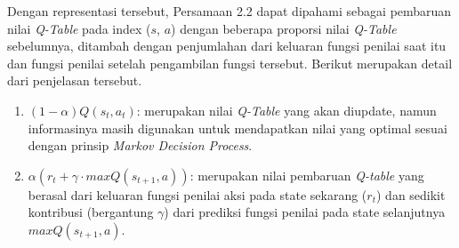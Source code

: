 Dengan representasi tersebut, Persamaan 2.2 dapat dipahami sebagai pembaruan nilai \textit{Q-Table} pada index (\(s\), \(a\)) dengan beberapa proporsi nilai \textit{Q-Table} sebelumnya, ditambah dengan penjumlahan dari keluaran fungsi penilai saat itu dan fungsi penilai setelah pengambilan fungsi tersebut. Berikut merupakan detail dari penjelasan tersebut.


\begin{enumerate}
	\item \((1-\alpha) Q(s_t,a_t)\): merupakan nilai \textit{Q-Table} yang akan diupdate, namun informasinya masih digunakan untuk mendapatkan nilai yang optimal sesuai dengan prinsip \textit{Markov Decision Process}.
	\item \(\alpha (r_t + \gamma \cdot maxQ(s_{t+1},a))\): merupakan nilai pembaruan \textit{Q-table} yang berasal dari keluaran fungsi penilai aksi pada state sekarang (\(r_t\)) dan sedikit kontribusi (bergantung \(\gamma\)) dari prediksi fungsi penilai pada state selanjutnya \(maxQ(s_{t+1},a)\).
\end{enumerate}

